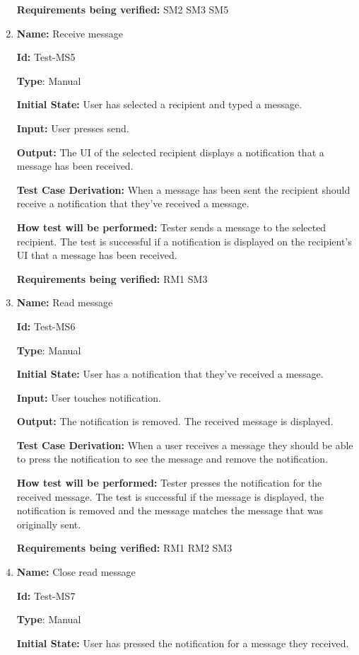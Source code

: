 \documentclass[12pt, titlepage]{article}
\begin{document}
\begin{enumerate}
\textbf{Requirements being verified: } SM2 SM3 SM5

\item{\textbf{Name:} Receive message}

\textbf{Id:} Test-MS5

\textbf{Type}: Manual

\textbf{Initial State:} User has selected a recipient and typed a message.

\textbf{Input:} User presses send.

\textbf{Output:} The UI of the selected recipient displays a notification that a message has been received.

\textbf{Test Case Derivation:}
When a message has been sent the recipient should receive a notification that they've received a message.

\textbf{How test will be performed:}
Tester sends a message to the selected recipient. The test is successful if a notification is displayed on the recipient's UI that a message has been received.

\textbf{Requirements being verified: } RM1 SM3

\item{\textbf{Name:} Read message}

\textbf{Id:} Test-MS6

\textbf{Type}: Manual

\textbf{Initial State:} User has a notification that they've received a message.

\textbf{Input:} User touches notification.

\textbf{Output:} The notification is removed. The received message is displayed.

\textbf{Test Case Derivation:}
When a user receives a message they should be able to press the notification to see the message and remove the notification.

\textbf{How test will be performed:}
Tester presses the notification for the received message. The test is successful if the message is displayed, the notification is removed and the message matches the message that was originally sent.

\textbf{Requirements being verified: } RM1 RM2 SM3

\item{\textbf{Name:} Close read message}

\textbf{Id:} Test-MS7

\textbf{Type}: Manual

\textbf{Initial State:} User has pressed the notification for a message they received.


\end{enumerate}
\end{document}
